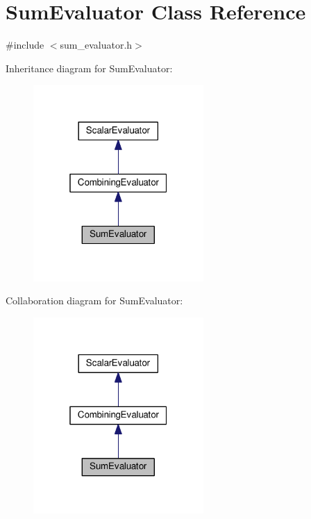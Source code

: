 \hypertarget{classSumEvaluator}{\section{Sum\-Evaluator Class Reference}
\label{classSumEvaluator}
}


{\ttfamily \#include $<$sum\-\_\-evaluator.\-h$>$}



Inheritance diagram for Sum\-Evaluator\-:
\nopagebreak
\begin{figure}[H]
\begin{center}
\leavevmode
\includegraphics[width=184pt]{classSumEvaluator__inherit__graph}
\end{center}
\end{figure}


Collaboration diagram for Sum\-Evaluator\-:
\nopagebreak
\begin{figure}[H]
\begin{center}
\leavevmode
\includegraphics[width=184pt]{classSumEvaluator__coll__graph}
\end{center}
\end{figure}
